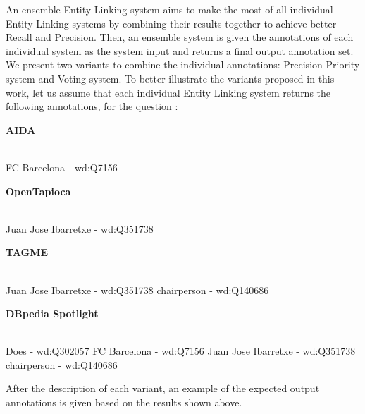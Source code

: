 An ensemble Entity Linking system aims to make the most of all individual Entity Linking 
systems by combining their results together to achieve better Recall and Precision. Then, an 
ensemble system is given the annotations of each individual system as the system input and 
returns a final output annotation set. We present two variants to combine the individual 
annotations: Precision Priority system and Voting system. To better illustrate the variants 
proposed in this work, let us assume that each individual 
Entity Linking system returns the following annotations, for the question :

\newpage

\noindent \textbf{AIDA}\\
\mbox{}\\
\begin{sparqlcode}[]
FC Barcelona - wd:Q7156
\end{sparqlcode}

\noindent \textbf{OpenTapioca}\\
\mbox{}\\
\begin{sparqlcode}[]
Juan Jose Ibarretxe - wd:Q351738  
\end{sparqlcode}

\noindent \textbf{TAGME}\\
\mbox{}\\
\begin{sparqlcode}[]
Juan Jose Ibarretxe - wd:Q351738    
chairperson - wd:Q140686  
\end{sparqlcode}

\noindent \textbf{DBpedia Spotlight}\\
\mbox{}\\
\begin{sparqlcode}[]
Does - wd:Q302057
FC Barcelona - wd:Q7156
Juan Jose Ibarretxe - wd:Q351738
chairperson - wd:Q140686    
\end{sparqlcode}

After the description of each variant, an example of the expected output annotations is given 
based on the results shown above.

